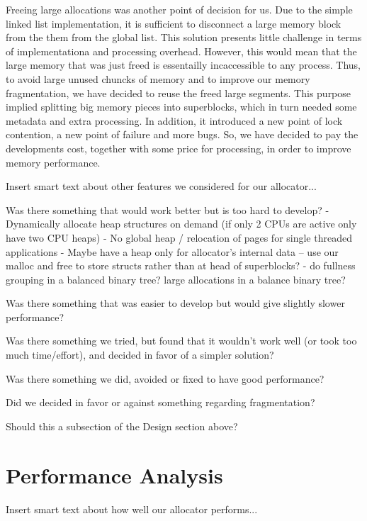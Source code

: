 \documentclass{article}
\begin{document}
Freeing large allocations was another point of decision for us. Due to the
simple linked list implementation, it is sufficient to disconnect a large 
memory block from the them from the global list. This solution presents 
little challenge in terms of implementationa and processing overhead. 
However, this would mean that the large memory that was just freed is
essentailly incaccessible to any process. Thus, to avoid large unused chuncks
of memory and to improve our memory fragmentation, we have decided to 
reuse the freed large segments. This purpose implied splitting big memory 
pieces into superblocks, which in turn needed some metadata and extra 
processing. In addition, it introduced a new point of lock contention, a new 
point of failure and more bugs. So, we have decided to pay the developments 
cost, together with some price for processing, in order to improve memory
performance.

Insert smart text about other features we considered for our allocator...

Was there something that would work better but is too hard to develop?
- Dynamically allocate heap structures on demand (if only 2 CPUs are
active only have two CPU heaps)
- No global heap / relocation of pages for single threaded applications
- Maybe have a heap only for allocator's internal data -- use our malloc
and free to store structs rather than at head of superblocks?
- do fullness grouping in a balanced binary tree? large allocations in a
balance binary tree?

Was there something that was easier to develop but would give slightly slower
performance?

Was there something we tried, but found that it wouldn't work well (or took too 
much time/effort), and decided in favor of a simpler solution?

Was there something we did, avoided or fixed to have good performance?

Did we decided in favor or against something regarding fragmentation?

Should this a subsection of the Design section above?



\newpage
\section{Performance Analysis}
\label{sec:performance}

Insert smart text about how well our allocator performs...
\end{document}
